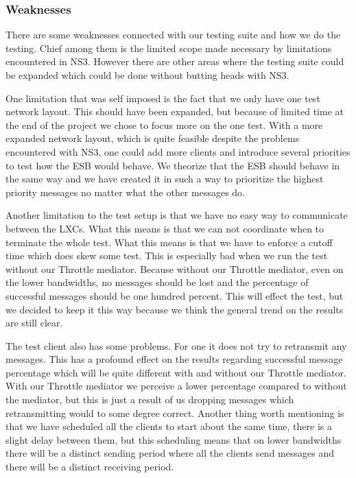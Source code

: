 \subsubsection{Weaknesses}\label{Testing:About:Weaknesses}
	There are some weaknesses connected with our testing suite and how we do the testing. Chief among them is the limited scope made necessary by limitations encountered in NS3. However there are other areas where the testing suite could be expanded which could be done without butting heads with NS3.
	
	One limitation that was self imposed is the fact that we only have one test network layout. This should have been expanded, but because of limited time at the end of the project we chose to focus more on the one test. With a more expanded network layout, which is quite feasible despite the problems encountered with NS3, one could add more clients and introduce several priorities to test how the ESB would behave. We theorize that the ESB should behave in the same way and we have created it in such a way to prioritize the highest priority messages no matter what the other messages do.
	
	Another limitation to the test setup is that we have no easy way to communicate between the LXCs. What this means is that we can not coordinate when to terminate the whole test. What this means is that we have to enforce a cutoff time which does skew some test. This is especially bad when we run the test without our Throttle mediator. Because without our Throttle mediator, even on the lower bandwidths, no messages should be lost and the percentage of successful messages should be one hundred percent. This will effect the test, but we decided to keep it this way because we think the general trend on the results are still clear.
	
	The test client also has some problems. For one it does not try to retransmit any messages. This has a profound effect on the results regarding successful message percentage which will be quite different with and without our Throttle mediator. With our Throttle mediator we perceive a lower percentage compared to without the mediator, but this is just a result of us dropping messages which retransmitting would to some degree correct. Another thing worth mentioning is that we have scheduled all the clients to start about the same time, there is a slight delay between them, but this scheduling means that on lower bandwidths there will be a distinct sending period where all the clients send messages and there will be a distinct receiving period.
	
